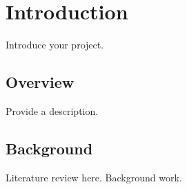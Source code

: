 
\chapter{Introduction}

Introduce your project. 

\section{Overview}
Provide a description.  

\section{Background}

Literature review here.  Background work.   